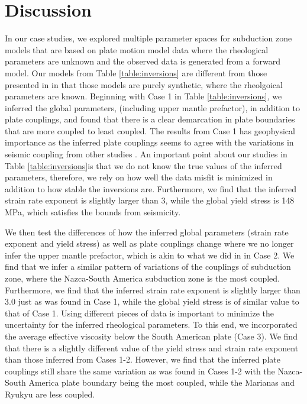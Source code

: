 \documentclass[12pt]{article}
\newcommand{\vrnote}[1]{\textcolor{red}{VR: #1}}
\begin{document}

\section{Discussion}
In our case studies, we explored multiple parameter spaces for subduction zone models that are based on plate motion model data where the rheological parameters are unknown and the observed data is generated from a forward model. Our models from Table \ref{table:inversions} are different from those presented in \citep{ratnaswamy2015adjoint} in that those models are purely synthetic, where the rheolgoical parameters are known. Beginning with Case 1 in Table \ref{table:inversions}, we inferred the global parameters, (including upper mantle prefactor), in addition to plate couplings, and found that there is a clear demarcation in plate boundaries that are more coupled to least coupled. The results from Case 1 has geophysical importance as the inferred plate couplings seems to agree with the variations in seismic coupling from other studies \citep{scholz1995mechanism}.  An important point about our studies in Table \ref{table:inversions}is that we do not know the true values of the inferred parameters, therefore, we rely on how well the data misfit is minimized in addition to how stable the inversions are. Furthermore, we find that the inferred strain rate exponent is slightly larger than 3, while the global yield stress is 148 MPa, which satisfies the bounds from seismicity.

We then test the differences of how the inferred global parameters (strain rate exponent and yield stress) as well as plate couplings change where we no longer infer the upper mantle prefactor, which is akin to what we did in \citep{ratnaswamy2015adjoint} in Case 2. We find that we infer a similar pattern of variations of the couplings of subduction zone, where the Nazca-South America subduction zone is the most coupled. Furthermore, we find that the inferred strain rate exponent is slightly larger than 3.0 just as was found in Case 1, while the global yield stress is of similar value to that of Case 1. Using different pieces of data is important to minimize the uncertainty for the inferred rheological parameters. To this end, we incorporated the average effective viscosity below the South American plate (Case 3).  We find that there is a slightly different value of the yield stress and strain rate exponent than those inferred from Cases 1-2. However, we find that the inferred plate couplings still share the same variation as was found in Cases 1-2 with the Nazca-South America plate boundary being the most coupled, while the Marianas and Ryukyu are less coupled.
\end{document}
